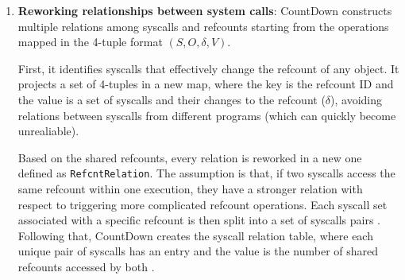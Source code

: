 \begin{enumerate}
    To identify the same object across different virtual machines during fuzzing, it uses a checksum of the call stack at the time of the object's initialization through \texttt{refcount\_set}.

    CountDown creates a RAI map (\texttt{refcount-address-ID}) to link the memory addresses holding refcount values with their refcount IDs:
    \begin{itemize}
        \item when a refcount is initialized, a new entry in the RAI map is created with its address and ID;
        \item when a refcount reaches zero, the entry is removed from the map;
        \item when a refcount is incremented or decremented, CountDown searches the address in the map to find its ID and records the operation.
    \end{itemize}

    During fuzzing, to connect refcount operations with syscalls, CountDown records the Syzkaller syscall number (NR) for each operation and considers that one syscall may modify a refcount many times, but it only cares about the final variation ($\delta$). In order to do so, every API listed in table \ref{table:refcounts} is modified to record every single change.
    This data is kept in a two-dimension table (one for the syscall number, one for the refcount ID), in which every entry records the current $\delta$ and the current $V$. 

    \item \textbf{Reworking relationships between system calls}:  CountDown constructs multiple relations among syscalls and refcounts starting from the operations mapped in the 4-tuple format $(S, O, \delta, V)$.
    
    First, it identifies syscalls that effectively change the refcount of any object.  It projects a set of 4-tuples in a new map, where the key is the refcount ID and the value is a set of syscalls and their changes to the refcount ($\delta$), avoiding relations between syscalls from different programs (which can quickly become unrealiable).
    
    Based on the shared refcounts, every relation is reworked in a new one defined as \texttt{RefcntRelation}. The assumption is that, if two syscalls access the same refcount within one execution, they have a stronger relation with respect to triggering more complicated refcount operations. Each syscall set associated with a specific refcount is then split into a set of syscalls pairs . Following that, CountDown creates the syscall relation table, where each unique pair of syscalls has an entry and the value is the number of shared refcounts accessed by both .
    

\end{enumerate}

